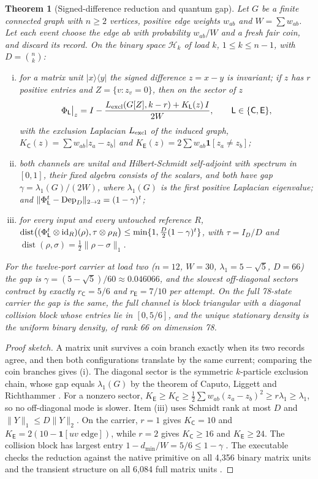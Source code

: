\documentclass[11pt]{article}
\newtheorem{theorem}{Theorem}[section]
\theoremstyle{definition}
\theoremstyle{remark}
\theoremstyle{plain}
\newcommand{\ket}[1]{\lvert #1\rangle}
\newcommand{\bra}[1]{\langle #1\rvert}
\newcommand{\Cn}{\mathsf{C}}
\newcommand{\En}{\mathsf{E}}
\newcommand{\dist}{\operatorname{dist}}
\newcommand{\Hil}{\mathcal{H}}
\begin{document}
\begin{theorem}[Signed-difference reduction and quantum gap]
\label{thm:gap}
Let $G$ be a finite connected graph with $n\ge2$ vertices, positive edge
weights $w_{ab}$ and $W=\sum w_{ab}$. Let each event choose the edge $ab$ with
probability $w_{ab}/W$ and a fresh fair coin, and discard its record. On the
binary space $\Hil_k$ of load $k$, $1\le k\le n-1$, with $D=\binom nk$:
\begin{enumerate}[(i)]
\item for a matrix unit $\ket x\bra y$ the signed difference $z=x-y$ is
invariant; if $z$ has $r$ positive entries and $Z=\{v:z_v=0\}$, then on the
sector of $z$
\[
\Phi_{\mathsf L}\big|_z=I-\frac{L_{\rm excl}(G[Z],k-r)+K_{\mathsf L}(z)\,I}{2W},
\qquad \mathsf L\in\{\Cn,\En\},
\]
with the exclusion Laplacian $L_{\rm excl}$ of the induced graph,
$K_\Cn(z)=\sum w_{ab}\lvert z_a-z_b\rvert$ and
$K_\En(z)=2\sum w_{ab}\mathbf 1[z_a\neq z_b]$;
\item both channels are unital and Hilbert-Schmidt self-adjoint with spectrum
in $[0,1]$, their fixed algebra consists of the scalars, and both have gap
$\gamma=\lambda_1(G)/(2W)$, where $\lambda_1(G)$ is the first positive
Laplacian eigenvalue; and
$\lVert\Phi^t_{\mathsf L}-{\rm Dep}_D\rVert_{2\to2}=(1-\gamma)^t$;
\item for every input and every untouched reference $R$,
$\dist\bigl((\Phi^t_{\mathsf L}\otimes{\rm id}_R)(\rho),\tau\otimes\rho_R\bigr)
\le\min\{1,\tfrac{D}{2}(1-\gamma)^t\}$, with $\tau=I_D/D$ and
$\dist(\rho,\sigma)=\frac12\lVert\rho-\sigma\rVert_1$.
\end{enumerate}
For the twelve-port carrier at load two ($n=12$, $W=30$,
$\lambda_1=5-\sqrt5$, $D=66$) the gap is $\gamma=(5-\sqrt5)/60\approx0.046066$,
and the slowest off-diagonal sectors contract by exactly $r_\Cn=5/6$ and
$r_\En=7/10$ per attempt. On the full 78-state carrier the gap is the same,
the full channel is block triangular with a diagonal collision block whose
entries lie in $[0,5/6]$, and the unique stationary density is the uniform binary density, of rank 66 on
dimension 78.
\end{theorem}

\begin{proof}[Proof sketch]
A matrix unit survives a coin branch exactly when its two records agree, and
then both configurations translate by the same current; comparing the coin
branches gives (i). The diagonal sector is the symmetric $k$-particle
exclusion chain, whose gap equals $\lambda_1(G)$ by the theorem of Caputo,
Liggett and Richthammer \cite{caputo2010}. For a nonzero sector,
$K_\En\ge K_\Cn\ge\frac12\sum w_{ab}(z_a-z_b)^2\ge r\lambda_1\ge\lambda_1$, so
no off-diagonal mode is slower. Item (iii) uses Schmidt rank at most $D$ and
$\lVert Y\rVert_1\le D\lVert Y\rVert_2$. On the carrier, $r=1$ gives
$K_\Cn=10$ and $K_\En=2(10-\mathbf 1[uv\text{ edge}])$, while $r=2$ gives
$K_\Cn\ge16$ and $K_\En\ge24$. The collision block has largest entry
$1-d_{\min}/W=5/6\le1-\gamma$ \cite{oQM}. The executable checks
the reduction against the native primitive on all 4,356 binary matrix units
and the transient structure on all 6,084 full matrix units \cite{rQM}.
\end{proof}
\end{document}
